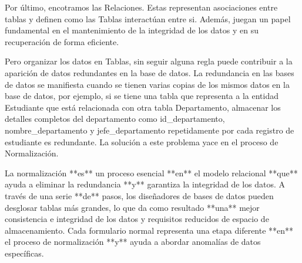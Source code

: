 Por \'ultimo, encotramos las Relaciones. Estas representan asociaciones entre tablas y definen como las Tablas interactúan
entre si. Además, juegan un papel fundamental en el mantenimiento de la integridad de los datos y en su recuperación de forma 
eficiente. 

Pero organizar los datos en Tablas, sin seguir alguna regla puede contribuir a la aparici\'on de datos redundantes en la 
base de datos. La redundancia en las bases de datos se manifiesta cuando se tienen varias copias de los mismos datos en la 
base de datos, por ejemplo, si se tiene una tabla que representa a la entidad Estudiante que est\'a relacionada con otra 
tabla Departamento, almacenar los detalles completos del departamento como id_departamento, nombre_departamento y 
jefe_departamento repetidamente por cada registro de estudiante es redundante. La soluci\'on a este problema yace en el 
proceso de Normalización.



La normalización **es** un proceso esencial **en** el modelo relacional **que** ayuda a eliminar la redundancia **y** 
garantiza la integridad de los datos. A través de una serie **de** pasos, los diseñadores de bases de datos pueden 
desglosar tablas más grandes, lo que da como resultado **una** mejor consistencia e integridad de los datos y requisitos 
reducidos de espacio de almacenamiento. Cada formulario normal representa una etapa diferente **en** el proceso de 
normalización **y** ayuda a abordar anomalías de datos específicas.